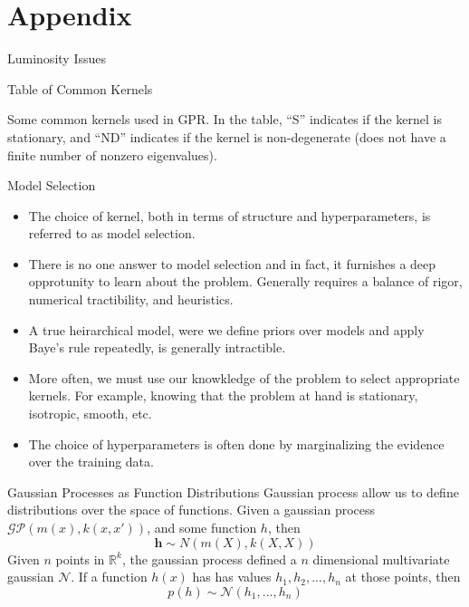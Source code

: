 \documentclass[10pt]{beamer}
\begin{document}
\section{Appendix}
\label{sec:appendix}


\begin{frame}{Luminosity Issues}
  \relax
\end{frame}

\begin{frame}{Table of Common Kernels}
  \begin{center}
  \end{center}
  \begin{center}
    Some common kernels used in GPR. In the table, ``S'' indicates if the kernel is stationary, and ``ND'' indicates if the kernel is non-degenerate (does not have a finite number of nonzero eigenvalues).
  \end{center}
\end{frame}

\begin{frame}{Model Selection}
  \begin{itemize}
  \item The choice of kernel, both in terms of structure and hyperparameters, is referred to as model selection. 
  \item There is no one answer to model selection and in fact, it furnishes a deep opprotunity to learn about the problem.
    Generally requires a balance of rigor, numerical tractibility, and heuristics.  
  \item A true heirarchical model, were we define priors over models and apply Baye's rule repeatedly, is generally intractible.
  \item More often, we must use our knowkledge of the problem to select appropriate kernels. For example, knowing that the problem at hand is stationary, isotropic, smooth, etc. 
  \item The choice of hyperparameters is often done by marginalizing the evidence over the training data.
  \end{itemize}
\end{frame}

\begin{frame}{Gaussian Processes as Function Distributions}
  Gaussian process allow us to define distributions over the space of functions. Given a gaussian process $\mathcal{GP} \left( m(x) , k(x,x') \right)$, and some function $h$, then
  \begin{equation}
    \mathbf{h} \sim N(m(X) , k(X,X))
  \end{equation}
  Given $n$ points in $\mathbb{R}^{k}$, the gaussian process defined a $n$ dimensional multivariate gaussian $\mathcal{N}$. If a function $h(x)$ has has values $h_1,h_2,...,h_{n}$ at those points, then
  \begin{equation}
    p \left( h \right) \sim \mathcal{N}(h_{1}, ..., h_{n})
  \end{equation}

  \begin{center}
  \end{center}
\end{frame}
\end{document}
